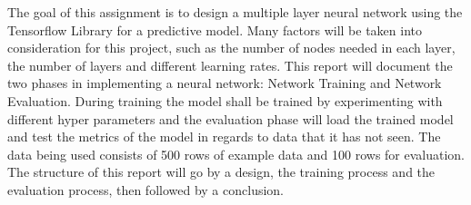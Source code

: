 
The goal of this assignment is to design a multiple layer neural network using the Tensorflow Library for a predictive model. Many factors will be taken into consideration for this project, such as the number of nodes needed in each layer, the number of layers and different learning rates. This report will document the two phases in implementing a neural network: Network Training and Network Evaluation. During training the model shall be trained by experimenting with different hyper parameters and the evaluation phase will load the trained model and test the metrics of the model in regards to data that it has not seen. The data being used consists of 500 rows of example data and 100 rows for evaluation. \\ The structure of this report will go by a design, the training process and the evaluation process, then followed by a conclusion.

